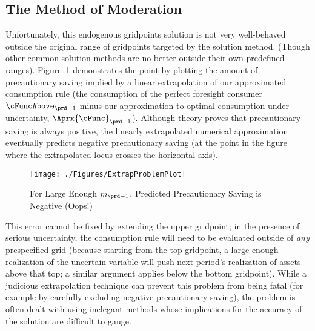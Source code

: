 \hypertarget{the-method-of-moderation}{}
\subsection{The Method of Moderation}\label{sec:method-of-moderation}

  Unfortunately, this endogenous gridpoints solution is not very
  well-behaved outside the original range of gridpoints targeted by
  the solution method.  (Though other common solution methods are no
  better outside their own predefined ranges).
  Figure~\ref{fig:ExtrapProblem} demonstrates the point by plotting
  the amount of precautionary saving implied by a linear extrapolation
  of our approximated consumption rule (the consumption of the perfect
  foresight consumer $\cFuncAbove_{\prd-1}$ minus our approximation to
  optimal consumption under uncertainty, $\Aprx{\cFunc}_{\prd-1}$).
  Although theory proves that precautionary saving is always positive,
  the linearly extrapolated numerical approximation eventually
  predicts negative precautionary saving (at the point in the figure
  where the extrapolated locus crosses the horizontal axis).

  \hypertarget{ExtrapProblemPlot}{}
  \begin{figure}
    \texttt{[image: ./Figures/ExtrapProblemPlot]}
    \caption{For Large Enough $m_{\prd-1}$, Predicted Precautionary Saving is Negative (Oops!)}
    \label{fig:ExtrapProblem}
  \end{figure}

  This error cannot be fixed by extending the upper gridpoint; in the presence of serious uncertainty, the consumption rule will need to be evaluated outside of \textit{any} prespecified grid (because starting from the top gridpoint, a large enough realization of the uncertain variable will push next period's realization of assets above that top; a similar argument applies below the bottom gridpoint).  While a judicious extrapolation technique can prevent this problem from being fatal (for example by carefully excluding negative precautionary saving), the problem is often dealt with using inelegant methods whose implications for the accuracy of the solution are difficult to gauge.



